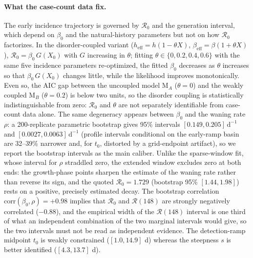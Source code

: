 \documentclass[preprint,12pt,numbers]{elsarticle}
\newcommand{\Reff}{\mathcal{R}}
\begin{document}
\paragraph{What the case-count data fix.}
The early incidence trajectory is governed by $\Reff_0$ and the
generation interval, which depend on $\beta_0$ and the natural-history
parameters but not on how $\Reff_0$ factorizes. In the disorder-coupled
variant ($h_{\mathrm{eff}}=h(1-\theta X)$,
$\beta_{\mathrm{eff}}=\beta(1+\theta X)$), $\Reff_0=\beta_0\,G(X_0)$
with $G$ increasing in $\theta$; fitting $\theta\in\{0,0.2,0.4,0.6\}$
with the same five incidence parameters re-optimized, the fitted
$\beta_0$ decreases as $\theta$ increases so that $\beta_0\,G(X_0)$
changes little, while the likelihood improves monotonically. Even so,
the AIC gap between the uncoupled model M$_{A}$ ($\theta=0$) and the
weakly coupled M$_{B}$ ($\theta=0.2$) is below two units, so the
disorder coupling is statistically indistinguishable from zero:
$\Reff_0$ and $\theta$ are not separately identifiable from case-count
data alone. The same degeneracy appears between $\beta_0$ and the
waning rate $\rho$: a 200-replicate parametric bootstrap gives 95\%
intervals $[0.149,0.205]\,\mathrm{d}^{-1}$ and
$[0.0027,0.0063]\,\mathrm{d}^{-1}$ (profile intervals conditional on the
early-ramp basin are 32--39\% narrower and, for $t_0$, distorted by a
grid-endpoint artifact), so we report the bootstrap intervals as the
main caliber. Unlike the sparse-window fit, whose interval for $\rho$
straddled zero, the extended window excludes zero at both ends: the
growth-phase points sharpen the estimate of the waning rate rather than
reverse its sign, and the quoted $\Reff_0=1.729$ (bootstrap 95\%
$[1.44,1.98]$) rests on a positive, precisely estimated decay. The
bootstrap correlation $\mathrm{corr}(\beta_0,\rho)=+0.98$ implies that
$\Reff_0$ and $\Reff(148)$ are strongly negatively correlated ($-0.88$),
and the empirical width of the $\Reff(148)$ interval is one third of
what an independent combination of the two marginal intervals would
give, so the two intervals must not be read as independent evidence.
The detection-ramp midpoint $t_0$ is weakly constrained
($[1.0,14.9]$ d) whereas the steepness $s$ is better identified
($[4.3,13.7]$ d).
\end{document}
